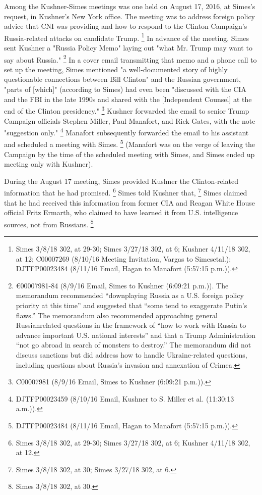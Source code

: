 Among the Kushner-Simes meetings was one held on August 17, 2016, at Simes's request, in Kushner's New York office.
The meeting was to address foreign policy advice that CNI was providing and how to respond to the Clinton Campaign's Russia-related attacks on candidate Trump.%
\footnote{Simes 3/8/18 302, at 29-30;
Simes 3/27/18 302, at 6;
Kushner 4/11/18 302, at 12;
C00007269 (8/10/16 Meeting Invitation, Vargas to Simesetal.);
DJTFP00023484 (8/11/16 Email, Hagan to Manafort (5:57:15 p.m.)).}
In advance of the meeting, Simes sent Kushner a "Russia Policy Memo" laying out "what Mr. Trump may want to say about Russia."%
\footnote{€00007981-84 (8/9/16 Email, Simes to Kushner (6:09:21 p.m.)).
The memorandum recommended “downplaying Russia as a U.S. foreign policy priority at this time” and suggested that “some tend to exaggerate Putin’s flaws.”
The memorandum also recommended approaching general Russianrelated questions in the framework of “how to work with Russia to advance important U.S. national interests” and that a Trump Administration “not go abroad in search of monsters to destroy.”
The memorandum did not discuss sanctions but did address how to handle Ukraine-related questions, including questions about Russia’s invasion and annexation of Crimea.}
In a cover email transmitting that memo and a phone call to set up the meeting, Simes mentioned "a well-documented story of highly questionable connections between Bill Clinton" and the Russian government, "parts of [which]" (according to Simes) had even been "discussed with the CIA and the FBI in the late 1990s and shared with the [Independent Counsel] at the end of the Clinton presidency."%
\footnote{C00007981 (8/9/16 Email, Simes to Kushner (6:09:21 p.m.)).}
Kushner forwarded the email to senior Trump Campaign officials Stephen Miller, Paul Manafort, and Rick Gates, with the note "suggestion only."%
\footnote{DJTFP00023459 (8/10/16 Email, Kushner to S. Miller et al. (11:30:13 a.m.)).}
Manafort subsequently forwarded the email to his assistant and scheduled a meeting with Simes.%
\footnote{DJTFP00023484 (8/11/16 Email, Hagan to Manafort (5:57:15 p.m.)).}
(Manafort was on the verge of leaving the Campaign by the time of the scheduled meeting with Simes, and Simes ended up meeting only with Kushner).

During the August 17 meeting, Simes provided Kushner the Clinton-related information that he had promised.%
\footnote{Simes 3/8/18 302, at 29-30;
Simes 3/27/18 302, at 6;
Kushner 4/11/18 302, at 12.}
Simes told Kushner that,
\footnote{Simes 3/8/18 302, at 30;
Simes 3/27/18 302, at 6.}
Simes claimed that he had received this information from former CIA and Reagan White House official Fritz Ermarth, who claimed to have learned it from U.S. intelligence sources, not from Russians.%
\footnote{Simes 3/8/18 302, at 30.}

